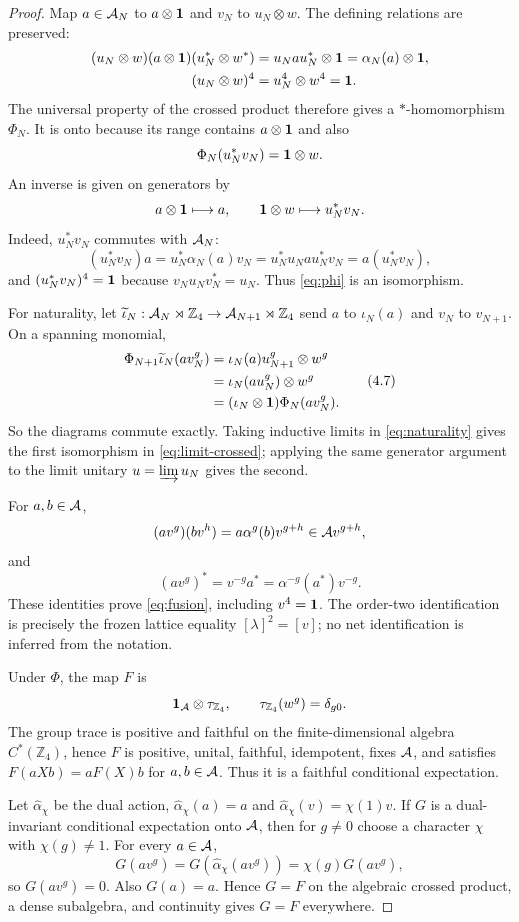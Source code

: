 \begin{proof}
Map $a\in\mathcal A_N$ to $a\otimes\mathbf 1$ and $v_N$ to $u_N\otimes w$.
The defining relations are preserved:
\[
\begin{aligned}
(u_N\otimes w)(a\otimes\mathbf 1)(u_N^*\otimes w^*)
 &=u_Nau_N^*\otimes\mathbf 1=\alpha_N(a)\otimes\mathbf 1,\\
(u_N\otimes w)^4&=u_N^4\otimes w^4=\mathbf 1.
\end{aligned}
\]
The universal property of the crossed product therefore gives a
$*$-homomorphism $\Phi_N$.  It is onto because its range contains
$a\otimes\mathbf 1$ and also
\[
 \Phi_N(u_N^*v_N)=\mathbf 1\otimes w.
\]
An inverse is given on generators by
\[
 a\otimes\mathbf 1\longmapsto a,\qquad
 \mathbf 1\otimes w\longmapsto u_N^*v_N.
\]
Indeed, $u_N^*v_N$ commutes with $\mathcal A_N$:
\[
 (u_N^*v_N)a
 =u_N^*\alpha_N(a)v_N
 =u_N^*u_Nau_N^*v_N
 =a(u_N^*v_N),
\]
and $(u_N^*v_N)^4=\mathbf 1$ because $v_Nu_Nv_N^*=u_N$.
Thus \eqref{eq:phi} is an isomorphism.

For naturality, let
$\widetilde\iota_N:\mathcal A_N\rtimes\mathbb Z_4
\to\mathcal A_{N+1}\rtimes\mathbb Z_4$
send $a$ to $\iota_N(a)$ and $v_N$ to $v_{N+1}$.  On a spanning
monomial,
\[
\begin{aligned}
\Phi_{N+1}\widetilde\iota_N(av_N^g)
 &=\iota_N(a)u_{N+1}^g\otimes w^g\\
 &=\iota_N(au_N^g)\otimes w^g\\
 &=(\iota_N\otimes\mathbf 1)\Phi_N(av_N^g).
\end{aligned}
\tag{4.7}\label{eq:naturality}
\]
So the diagrams commute exactly.  Taking inductive limits in
\eqref{eq:naturality} gives the first isomorphism in
\eqref{eq:limit-crossed}; applying the same generator argument to the
limit unitary $u=\varinjlim u_N$ gives the second.

For $a,b\in\mathcal A$,
\[
 (av^g)(bv^h)=a\alpha^g(b)v^{g+h}\in\mathcal A v^{g+h},
\]
and
\[
 (av^g)^*=v^{-g}a^*=\alpha^{-g}(a^*)v^{-g}.
\]
These identities prove \eqref{eq:fusion}, including $v^4=\mathbf 1$.
The order-two identification is precisely the frozen lattice equality
$[\lambda]^2=[v]$; no net identification is inferred from the notation.

Under $\Phi$, the map $F$ is
\[
 \mathbf 1_\mathcal A\otimes\tau_{\mathbb Z_4},
\qquad
\tau_{\mathbb Z_4}(w^g)=\delta_{g0}.
\]
The group trace is positive and faithful on the finite-dimensional
algebra $C^*(\mathbb Z_4)$, hence $F$ is positive, unital, faithful,
idempotent, fixes $\mathcal A$, and satisfies
$F(aXb)=aF(X)b$ for $a,b\in\mathcal A$.  Thus it is a faithful conditional
expectation.

Let $\widehat\alpha_\chi$ be the dual action,
$\widehat\alpha_\chi(a)=a$ and
$\widehat\alpha_\chi(v)=\chi(1)v$.  If $G$ is a dual-invariant
conditional expectation onto $\mathcal A$, then for $g\ne0$ choose a character
$\chi$ with $\chi(g)\ne1$.  For every $a\in\mathcal A$,
\[
 G(av^g)
 =G(\widehat\alpha_\chi(av^g))
 =\chi(g)G(av^g),
\]
so $G(av^g)=0$.  Also $G(a)=a$.  Hence $G=F$ on the algebraic crossed
product, a dense subalgebra, and continuity gives $G=F$ everywhere.


\end{proof}
